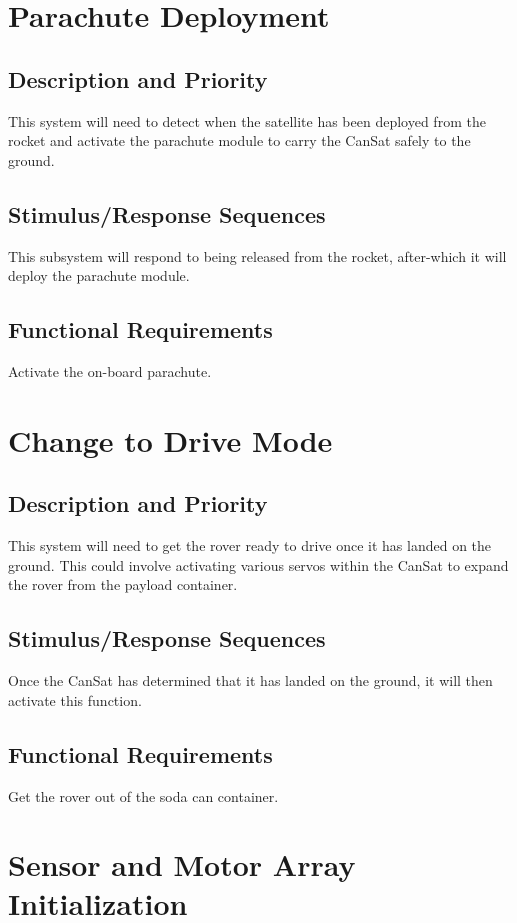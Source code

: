 \documentclass{scrreprt}
\begin{document}
\section{Parachute Deployment}


\subsection{Description and Priority}
This system will need to detect when the satellite has been deployed from the rocket and activate the parachute module to carry the CanSat safely to the ground.


\subsection{Stimulus/Response Sequences}
This  subsystem will respond to being released from the rocket, after-which it will deploy the parachute module.

\subsection{Functional Requirements}
Activate the on-board parachute.


\section{Change to Drive Mode}

\subsection{Description and Priority}
This system will need to get the rover ready to drive once it has landed on the ground. This could involve activating various servos within the CanSat to expand the rover from the payload container.


\subsection{Stimulus/Response Sequences}
Once the CanSat has determined that it has landed on the ground, it will then activate this function.

\subsection{Functional Requirements}
Get the rover out of the soda can container.
\section{Sensor and Motor Array Initialization}
\end{document}

